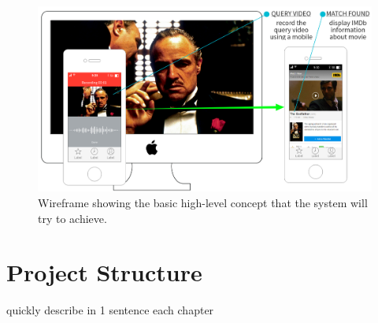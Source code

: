 \begin{figure}[h]
\centerline{\includegraphics[width=1.15\textwidth]{figures/system_wireframe.png}}
\caption{\label{fig:wireframe}Wireframe showing the basic high-level concept that the system will try to achieve.}
\end{figure}

\section{Project Structure}

quickly describe in 1 sentence each chapter